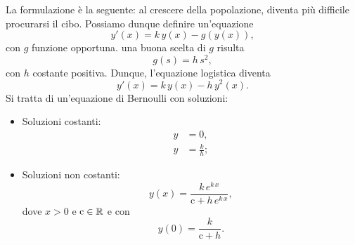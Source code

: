 \documentclass[../../analisi2]{subfiles}
\begin{document}
            La formulazione è la seguente: al crescere della popolazione, diventa più difficile procurarsi il cibo. Possiamo dunque
            definire un'equazione
            \[
                y'(x) = k \, y(x) - g(y(x)),
            \]
            con \(g\) funzione opportuna. una buona scelta di \(g\) risulta
            \[
                g(s) = h \, s^2,
            \]
            con \(h\) costante positiva. Dunque, l'equazione logistica diventa
            \[
                y'(x) = k \, y(x) - h \, y^2(x).
            \]
            Si tratta di un'equazione di Bernoulli con soluzioni:
            \begin{itemize}
                \item Soluzioni costanti:
                    \begin{align*}
                        y &= 0,\\
                        y &= \frac{k}{h};
                    \end{align*}
                \item Soluzioni non costanti:
                    \[
                        y(x) = \frac{k \, e^{k \, x}}{\mathrm{c} + h \, e^{k \, x}},
                    \]
                    dove \(x > 0\) e \(\mathrm{c} \in \mathbb{R}\) e con
                    \[
                        y(0) = \frac{k}{\mathrm{c} + h}.
                    \]
            \end{itemize}
\end{document}
